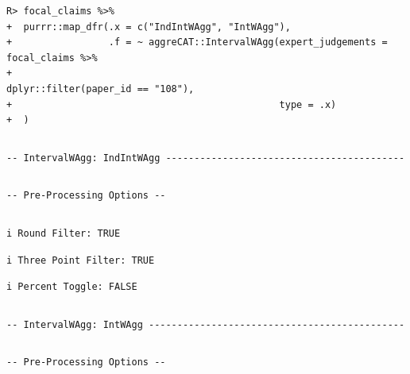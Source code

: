 \documentclass[article]{jss}
\begin{document}
\begin{verbatim}
R> focal_claims %>% 
+  purrr::map_dfr(.x = c("IndIntWAgg", "IntWAgg"), 
+                 .f = ~ aggreCAT::IntervalWAgg(expert_judgements = focal_claims %>% 
+                                                 dplyr::filter(paper_id == "108"),
+                                               type = .x)
+  )
\end{verbatim}

\begin{verbatim}
\end{verbatim}

\begin{verbatim}
-- IntervalWAgg: IndIntWAgg ------------------------------------------
\end{verbatim}

\begin{verbatim}
\end{verbatim}

\begin{verbatim}
-- Pre-Processing Options --
\end{verbatim}

\begin{verbatim}
\end{verbatim}

\begin{verbatim}
i Round Filter: TRUE
\end{verbatim}

\begin{verbatim}
i Three Point Filter: TRUE
\end{verbatim}

\begin{verbatim}
i Percent Toggle: FALSE
\end{verbatim}

\begin{verbatim}
\end{verbatim}

\begin{verbatim}
-- IntervalWAgg: IntWAgg ---------------------------------------------
\end{verbatim}

\begin{verbatim}
\end{verbatim}

\begin{verbatim}
-- Pre-Processing Options --
\end{verbatim}

\begin{verbatim}
\end{verbatim}
\end{document}
